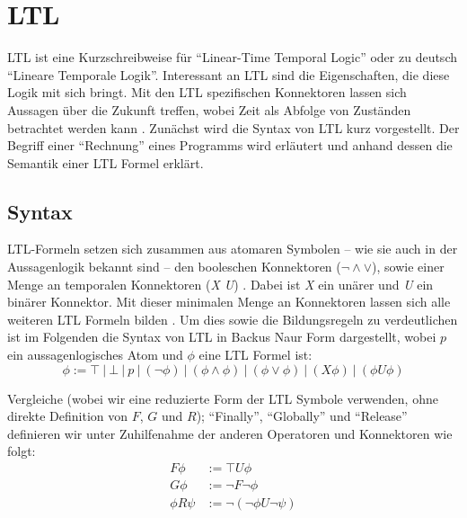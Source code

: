 \section{LTL}

LTL ist eine Kurzschreibweise für "`Linear-Time Temporal Logic"' oder zu deutsch "`Lineare Temporale Logik"'. Interessant an LTL sind die Eigenschaften, die diese Logik mit sich bringt. Mit den LTL spezifischen Konnektoren lassen sich Aussagen über die Zukunft treffen, wobei Zeit als Abfolge von Zuständen betrachtet werden kann \cite{huth+04}. Zunächst wird die Syntax von LTL kurz vorgestellt. Der Begriff einer "`Rechnung"' eines Programms wird erläutert und anhand dessen die Semantik einer LTL Formel erklärt.

\subsection{Syntax}

LTL-Formeln setzen sich zusammen aus atomaren Symbolen -- wie sie auch in der Aussagenlogik bekannt sind -- den booleschen Konnektoren ($\lnot \land \lor$), sowie einer Menge an temporalen Konnektoren (\textit{X U}) \cite{huth+04,vardi+96}. Dabei ist \textit{X} ein unärer und \textit{U} ein binärer Konnektor. Mit dieser minimalen Menge an Konnektoren lassen sich alle weiteren LTL Formeln bilden \cite{vardi+96}.
Um dies sowie die Bildungsregeln zu verdeutlichen ist im Folgenden die Syntax von LTL in Backus Naur Form dargestellt, wobei $p$ ein aussagenlogisches Atom und $\phi$ eine LTL Formel ist:
\begin{equation}
\label{ltl:syntax_basics}
    \phi := \top\ |\ \bot\ |\ p\ |\ (\lnot\phi)\ |\ (\phi \land \phi)\ |\ (\phi \lor \phi)\ |\ (X\phi)\ |\ (\phi U\phi)
\end{equation}

Vergleiche \cite{huth+04} (wobei wir eine reduzierte Form der LTL Symbole verwenden, ohne direkte Definition von $F$, $G$ und $R$); "`Finally"', "`Globally"' und "`Release"' definieren wir unter Zuhilfenahme der anderen Operatoren und Konnektoren wie folgt:
\begin{equation}
\label{ltl:syntax_details}
\begin{split}
    F\phi &:= \top U\phi\\
    G\phi &:= \lnot F\lnot\phi\\
    \phi R\psi &:= \lnot(\lnot\phi U\lnot\psi)\\
\end{split}
\end{equation}

